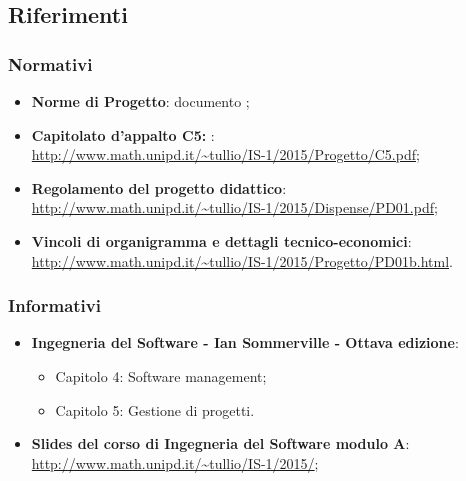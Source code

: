 \subsection{Riferimenti}
\subsubsection{Normativi}
	\begin{itemize}
		\item \textbf{Norme di Progetto}: documento \textit{\NdP};
		\item \textbf{Capitolato d'appalto C5: \progetto}:\\
		\url{http://www.math.unipd.it/~tullio/IS-1/2015/Progetto/C5.pdf};
		\item \textbf{Regolamento del progetto didattico}:\\
		\url{http://www.math.unipd.it/~tullio/IS-1/2015/Dispense/PD01.pdf};
		\item \textbf{Vincoli di organigramma e dettagli tecnico-economici}:\\
		\url{http://www.math.unipd.it/~tullio/IS-1/2015/Progetto/PD01b.html}.
	\end{itemize}
\subsubsection{Informativi}
	\begin{itemize}
		\item \textbf{Ingegneria del Software - Ian Sommerville - Ottava edizione}:
		\begin{itemize}
			\item Capitolo 4: Software management;
			\item Capitolo 5: Gestione di progetti.
		\end{itemize}
		\item \textbf{Slides del corso di Ingegneria del Software modulo A}:\\
		\url{http://www.math.unipd.it/~tullio/IS-1/2015/};
	\end{itemize}
